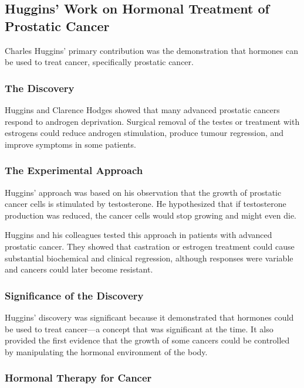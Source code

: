 \subsection{Huggins' Work on Hormonal Treatment of Prostatic Cancer}

Charles Huggins' primary contribution was the demonstration that hormones can be used to treat cancer, specifically prostatic cancer.

\subsubsection{The Discovery}

Huggins and Clarence Hodges showed that many advanced prostatic cancers respond to androgen deprivation. Surgical removal of the testes or treatment with estrogens could reduce androgen stimulation, produce tumour regression, and improve symptoms in some patients.

\subsubsection{The Experimental Approach}

Huggins' approach was based on his observation that the growth of prostatic cancer cells is stimulated by testosterone. He hypothesized that if testosterone production was reduced, the cancer cells would stop growing and might even die.

Huggins and his colleagues tested this approach in patients with advanced prostatic cancer. They showed that castration or estrogen treatment could cause substantial biochemical and clinical regression, although responses were variable and cancers could later become resistant.

\subsubsection{Significance of the Discovery}

Huggins' discovery was significant because it demonstrated that hormones could be used to treat cancer---a concept that was significant at the time. It also provided the first evidence that the growth of some cancers could be controlled by manipulating the hormonal environment of the body.

\subsubsection{Hormonal Therapy for Cancer}

